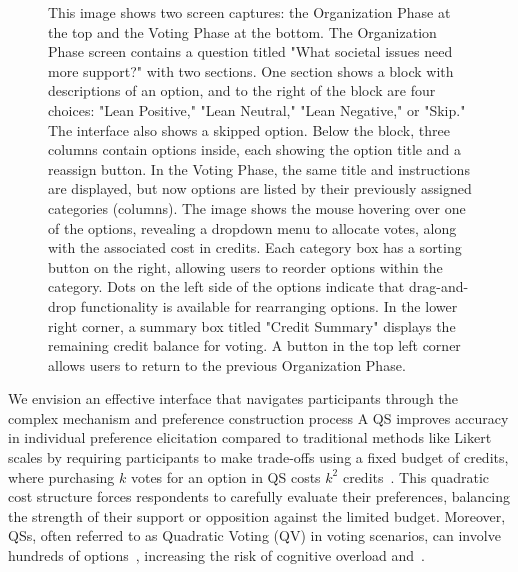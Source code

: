 \begin{figure}[ht]
{    This image shows two screen captures: the Organization Phase at the top and the Voting Phase at the bottom. The Organization Phase screen contains a question titled "What societal issues need more support?" with two sections. One section shows a block with descriptions of an option, and to the right of the block are four choices: "Lean Positive," "Lean Neutral," "Lean Negative," or "Skip." The interface also shows a skipped option. Below the block, three columns contain options inside, each showing the option title and a reassign button. In the Voting Phase, the same title and instructions are displayed, but now options are listed by their previously assigned categories (columns). The image shows the mouse hovering over one of the options, revealing a dropdown menu to allocate votes, along with the associated cost in credits. Each category box has a sorting button on the right, allowing users to reorder options within the category. Dots on the left side of the options indicate that drag-and-drop functionality is available for rearranging options. In the lower right corner, a summary box titled "Credit Summary" displays the remaining credit balance for voting. A button in the top left corner allows users to return to the previous Organization Phase.
    }

\end{figure}

We envision an effective interface that navigates participants through the complex mechanism and preference construction process A QS improves accuracy in individual preference elicitation compared to traditional methods like Likert scales by requiring participants to make trade-offs using a fixed budget of credits, where purchasing $k$ votes for an option in QS costs $k^2$ credits~\cite{quarfoot2017quadratic,chengCanShowWhat2021}. This quadratic cost structure forces respondents to carefully evaluate their preferences, balancing the strength of their support or opposition against the limited budget.  Moreover, QSs, often referred to as Quadratic Voting (QV) in voting scenarios, can involve hundreds of options~\cite{rogersColoradoTriedNew2019, teamTaiwanDigitalMinister}, increasing the risk of cognitive overload and~.

